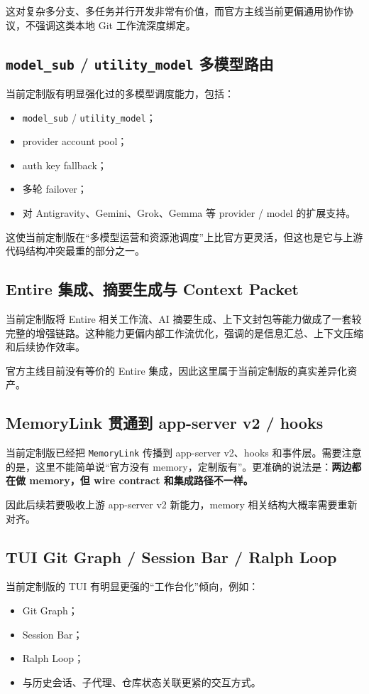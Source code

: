 \documentclass[UTF8,11pt]{ctexart}
\begin{document}
这对复杂多分支、多任务并行开发非常有价值，而官方主线当前更偏通用协作协议，不强调这类本地 Git 工作流深度绑定。

\subsection{\texttt{model\_sub} / \texttt{utility\_model} 多模型路由}
当前定制版有明显强化过的多模型调度能力，包括：
\begin{itemize}[nosep]
  \item \texttt{model\_sub} / \texttt{utility\_model}；
  \item provider account pool；
  \item auth key fallback；
  \item 多轮 failover；
  \item 对 Antigravity、Gemini、Grok、Gemma 等 provider / model 的扩展支持。
\end{itemize}

这使当前定制版在“多模型运营和资源池调度”上比官方更灵活，但这也是它与上游代码结构冲突最重的部分之一。

\subsection{Entire 集成、摘要生成与 Context Packet}
当前定制版将 Entire 相关工作流、AI 摘要生成、上下文封包等能力做成了一套较完整的增强链路。这种能力更偏内部工作流优化，强调的是信息汇总、上下文压缩和后续协作效率。

官方主线目前没有等价的 Entire 集成，因此这里属于当前定制版的真实差异化资产。

\subsection{MemoryLink 贯通到 app-server v2 / hooks}
当前定制版已经把 \texttt{MemoryLink} 传播到 app-server v2、hooks 和事件层。需要注意的是，这里不能简单说“官方没有 memory，定制版有”。更准确的说法是：\textbf{两边都在做 memory，但 wire contract 和集成路径不一样。}

因此后续若要吸收上游 app-server v2 新能力，memory 相关结构大概率需要重新对齐。

\subsection{TUI Git Graph / Session Bar / Ralph Loop}
当前定制版的 TUI 有明显更强的“工作台化”倾向，例如：
\begin{itemize}[nosep]
  \item Git Graph；
  \item Session Bar；
  \item Ralph Loop；
  \item 与历史会话、子代理、仓库状态关联更紧的交互方式。
\end{itemize}
\end{document}
